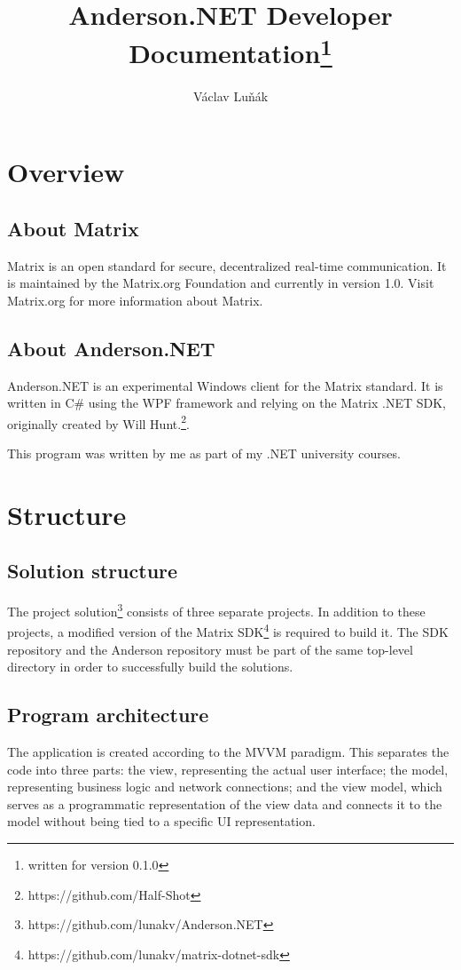 \documentclass[titlepage]{scrartcl}
\title{Anderson.NET Developer Documentation\thanks{written for version 0.1.0}}
\author{Václav Luňák}
\begin{document}
\maketitle
\tableofcontents
\pagebreak

\section{Overview}
\subsection{About Matrix}
Matrix is an open standard for secure, decentralized real-time communication. It is maintained by the Matrix.org Foundation and currently in version 1.0. Visit Matrix.org for more information about Matrix.

\subsection{About Anderson.NET}
Anderson.NET is an experimental Windows client for the Matrix standard. It is written in C\# using the WPF framework and relying on the Matrix .NET SDK, originally created by Will Hunt.\footnote{https://github.com/Half-Shot}.

This program was written by me as part of my .NET university courses.

\section{Structure}
\subsection{Solution structure}
The project solution\footnote{https://github.com/lunakv/Anderson.NET} consists of three separate projects. In addition to these projects, a modified version of the Matrix SDK\footnote{https://github.com/lunakv/matrix-dotnet-sdk} is required to build it. The SDK repository and the Anderson repository must be part of the same top-level directory in order to successfully build the solutions.

\subsection{Program architecture}
The application is created according to the MVVM paradigm. This separates the code into three parts: the view, representing the actual user interface; the model, representing business logic and network connections; and the view model, which serves as a programmatic representation of the view data and connects it to the model without being tied to a specific UI representation.
\end{document}
